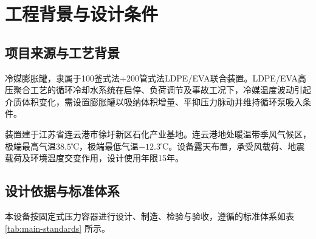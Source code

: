 
\chapter{工程背景与设计条件}

\section{项目来源与工艺背景}

冷媒膨胀罐，隶属于100釜式法+200管式法LDPE/EVA联合装置。LDPE/EVA高压聚合工艺的循环冷却水系统在启停、负荷调节及事故工况下，冷媒温度波动引起介质体积变化，需设置膨胀罐以吸纳体积增量、平抑压力脉动并维持循环泵吸入条件\cite{guocheng2020}。

装置建于江苏省连云港市徐圩新区石化产业基地。连云港地处暖温带季风气候区，极端最高气温$38.5$℃，极端最低气温$-12.3$℃。设备露天布置，承受风载荷、地震载荷及环境温度交变作用，设计使用年限15年。



\section{设计依据与标准体系}

本设备按固定式压力容器进行设计、制造、检验与验收，遵循的标准体系如表 \ref{tab:main-standards} 所示。

